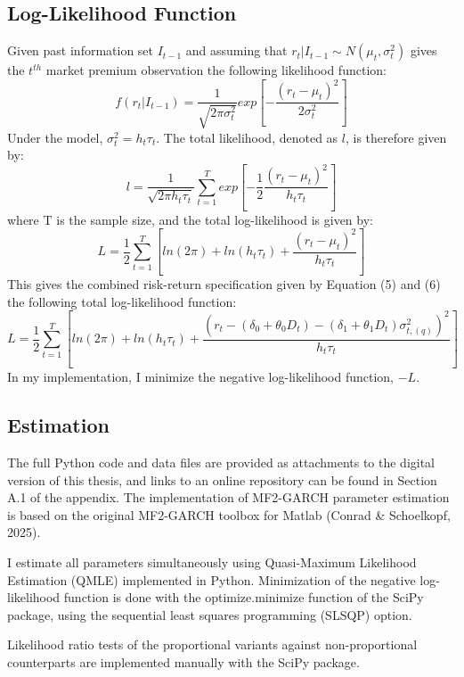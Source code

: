 \documentclass[12pt]{article}
\begin{document}
\subsection{Log-Likelihood Function}
Given past information set $I_{t-1}$ and assuming that $r_t | I_{t-1}\sim N(\mu_t,\sigma_t^2)$ gives the $t^{th}$ market premium observation the following likelihood function:
\begin{equation}
\nonumber
f(r_t|I_{t-1})=\frac{1}{\sqrt{2\pi\sigma_t^2}}exp\left[-\frac{(r_t-\mu_t)^2}{2\sigma_t^2}\right]
\end{equation}
Under the model, $\sigma_t^2=h_t\tau_t$. The total likelihood, denoted as $l$, is therefore given by:
\begin{equation}
\nonumber
l=\frac{1}{\sqrt{2\pi h_t\tau_t}}\sum_{t=1}^Texp\left[-\frac{1}{2}\frac{(r_t-\mu_t)^2}{h_t\tau_t}\right]
\end{equation}
where T is the sample size, and the total log-likelihood is given by:
\begin{equation}
\nonumber
L=\frac{1}{2}\sum_{t=1}^T[ln(2\pi)+ln(h_t\tau_t)+\frac{(r_t-\mu_t)^2}{h_t\tau_t}]
\end{equation}
This gives the combined risk-return specification given by Equation (5) and (6) the following  total log-likelihood function:
\begin{equation}
L=\frac{1}{2}\sum_{t=1}^T[ln(2\pi)+ln(h_t\tau_t)+\frac{(r_t-(\delta_0+\theta_0D_t)-(\delta_1+\theta_1D_t)\sigma_{t,(q)}^2)^2}{h_t\tau_t}]
\end{equation}
In my implementation, I minimize the negative log-likelihood function, $-L$.
\subsection{Estimation}
The full Python code and data files are provided as attachments to the digital version of this thesis, and links to an online repository can be found in Section A.1 of the appendix. The implementation of MF2-GARCH parameter estimation is based on the original MF2-GARCH toolbox for Matlab (Conrad \& Schoelkopf, 2025).\par
I estimate all parameters simultaneously using Quasi-Maximum Likelihood Estimation (QMLE) implemented in Python. Minimization of the negative log-likelihood function is done with the optimize.minimize function of the SciPy package, using the sequential least squares programming (SLSQP) option.\par
Likelihood ratio tests of the proportional variants against non-proportional counterparts are implemented manually with the SciPy package. 
\end{document}
